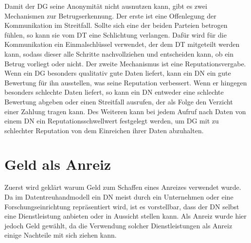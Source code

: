 \documentclass[
	fontsize=11pt,
	headings=small,
	parskip=half,           %
	bibliography=totoc,
	numbers=noenddot,       %
	open=any,               %
]{scrreprt}
\begin{document}
Damit der DG seine Anonymität nicht ausnutzen kann, gibt es zwei Mechanismen zur Betrugserkennung. Der erste ist eine Offenlegung der Kommunikation im Streitfall. Sollte sich eine der beiden Parteien betrogen fühlen, so kann sie vom DT eine Schlichtung verlangen. Dafür wird für die Kommunikation ein Einmalschlüssel verwendet, der dem DT mitgeteilt werden kann, sodass dieser alle Schritte nachvollziehen und entscheiden kann, ob ein Betrug vorliegt oder nicht. 
Der zweite Mechanismus ist eine Reputationsvergabe. Wenn ein DG besonders qualitativ gute Daten liefert, kann ein DN ein gute Bewertung für ihn ausstellen, was seine Reputation verbessert. Wenn er hingegen besonders schlechte Daten liefert, so kann ein DN entweder eine schlechte Bewertung abgeben oder einen Streitfall ausrufen, der als Folge den Verzicht einer Zahlung tragen kann. Des Weiteren kann bei jedem Aufruf nach Daten von einem DN ein Reputationsschwellwert festgelegt werden, um DG mit zu schlechter Reputation von dem Einreichen ihrer Daten abzuhalten. 

\section{Geld als Anreiz}
\label{sec:incentiveExplaination}
Zuerst wird geklärt warum Geld zum Schaffen eines Anreizes verwendet wurde. Da im Datentreuhandmodell ein DN meist durch ein Unternehmen oder eine Forschungseinrichtung repräsentiert wird, ist es vorstellbar, dass der DN selbst eine Dienstleistung anbieten oder in Aussicht stellen kann. Als Anreiz wurde hier jedoch Geld gewählt, da die Verwendung solcher Dienstleistungen als Anreiz einige Nachteile mit sich ziehen kann.
\end{document}
